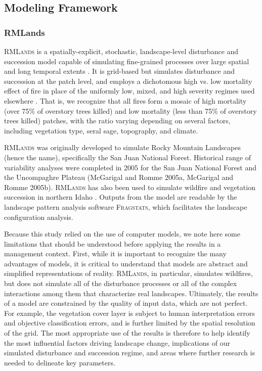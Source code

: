 \subsection{Modeling Framework}
\label{sec:modelframe}

\subsubsection{RMLands}
\textsc{RMLands} is a spatially-explicit, stochastic, landscape-level disturbance and succession model capable of simulating fine-grained processes over large spatial and long temporal extents \citep{McGarigal2005}. It is grid-based but simulates disturbance and succession at the patch level, and employs a dichotomous high vs. low mortality effect of fire in place of the uniformly low, mixed, and high severity regimes used elsewhere \citep{McGarigal2012}. That is, we recognize that all fires form a mosaic of high mortality (over 75\% of overstory trees killed) and low mortality (less than 75\% of overstory trees killed) patches, with the ratio varying depending on several factors, including vegetation type, seral sage, topography, and climate.

\textsc{RMLands} was originally developed to simulate Rocky Mountain Landscapes (hence the name), specifically the San Juan National Forest. Historical range of variability analyses were completed in 2005 for the San Juan National Forest and the Uncompaghre Plateau (McGarigal and Romme 2005a, McGarigal and Romme 2005b). \textsc{RMLands} has also been used to simulate wildfire and vegetation succession in northern Idaho \citep{Cushman2011}. Outputs from the model are readable by the landscape pattern analysis software \textsc{Fragstats}, which facilitates the landscape configuration analysis.

Because this study relied on the use of computer models, we note here some limitations that should be understood before applying the results in a management context. First, while it is important to recognize the many advantages of models, it is critical to understand that models are abstract and simplified representations of reality. \textsc{RMLands}, in particular, simulates wildfires, but does not simulate all of the disturbance processes or all of the complex interactions among them that characterize real landscapes. Ultimately, the results of a model are constrained by the quality of input data, which are not perfect. For example, the vegetation cover layer is subject to human interpretation errors and objective classification errors, and is further limited by the spatial resolution of the grid. The most appropriate use of the results is therefore to help identify the most influential factors driving landscape change, implications of our simulated disturbance and succession regime, and areas where further research is needed to delineate key parameters.

